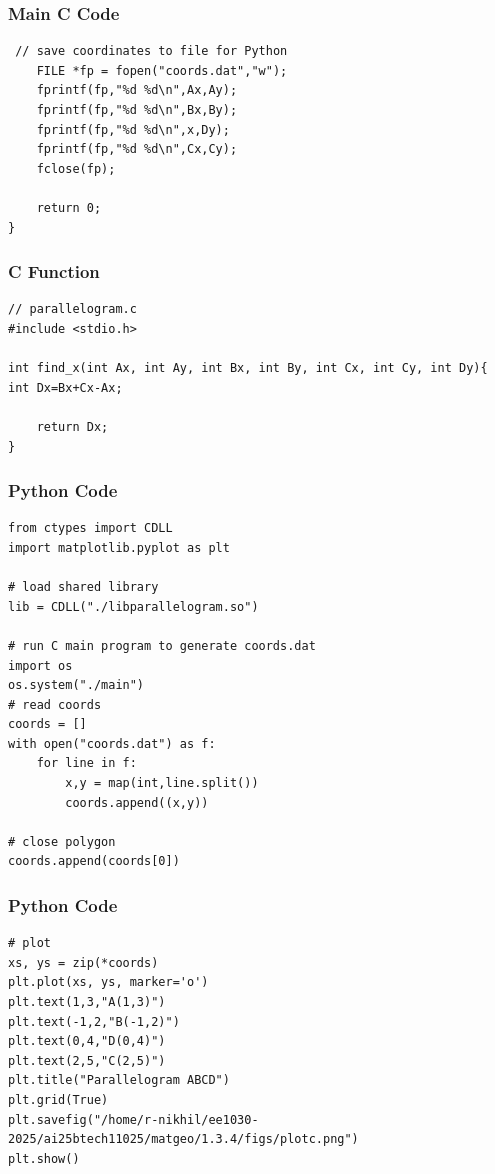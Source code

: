 \documentclass{beamer}
\begin{document}
\begin{frame}[fragile]
\frametitle{Main C Code}
   \begin{lstlisting}
 // save coordinates to file for Python
    FILE *fp = fopen("coords.dat","w");
    fprintf(fp,"%d %d\n",Ax,Ay);
    fprintf(fp,"%d %d\n",Bx,By);
    fprintf(fp,"%d %d\n",x,Dy);
    fprintf(fp,"%d %d\n",Cx,Cy);
    fclose(fp);

    return 0;
}
\end{lstlisting}
	\end{frame}

\begin{frame}[fragile]
\frametitle{C Function}
   \begin{lstlisting}
// parallelogram.c
#include <stdio.h>

int find_x(int Ax, int Ay, int Bx, int By, int Cx, int Cy, int Dy){
int Dx=Bx+Cx-Ax;

    return Dx;
}
\end{lstlisting}
\end{frame}

\begin{frame}[fragile]
\frametitle{Python Code}
   \begin{lstlisting}
from ctypes import CDLL
import matplotlib.pyplot as plt

# load shared library
lib = CDLL("./libparallelogram.so")

# run C main program to generate coords.dat
import os
os.system("./main")
# read coords
coords = []
with open("coords.dat") as f:
    for line in f:
        x,y = map(int,line.split())
        coords.append((x,y))

# close polygon
coords.append(coords[0])

\end{lstlisting}
\end{frame}


\begin{frame}[fragile]
\frametitle{Python Code}
   \begin{lstlisting}
# plot
xs, ys = zip(*coords)
plt.plot(xs, ys, marker='o')
plt.text(1,3,"A(1,3)")
plt.text(-1,2,"B(-1,2)")
plt.text(0,4,"D(0,4)")
plt.text(2,5,"C(2,5)")
plt.title("Parallelogram ABCD")
plt.grid(True)
plt.savefig("/home/r-nikhil/ee1030-2025/ai25btech11025/matgeo/1.3.4/figs/plotc.png")
plt.show()

\end{lstlisting}
\end{frame}
\end{document}
